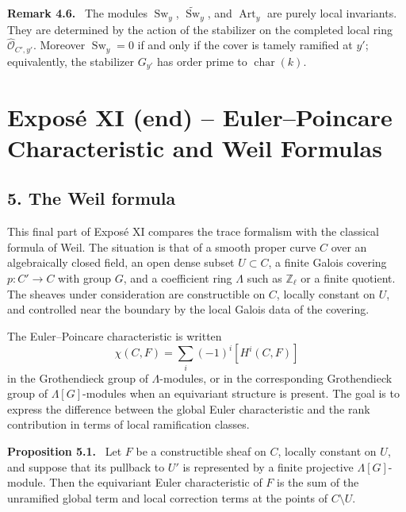 \documentclass[14pt]{extarticle}
\newcommand{\ZZ}{\mathbb Z}
\newcommand{\Sw}{\operatorname{Sw}}
\newcommand{\Art}{\operatorname{Art}}
\newcommand{\cO}{\mathcal O}
\newcommand{\wt}[1]{\widetilde{#1}}
\newcommand{\wh}[1]{\widehat{#1}}
\newenvironment{statement}[1]{\par\medskip\noindent\textbf{#1.}\ }{\par\medskip}
\begin{document}
\begin{statement}{Remark 4.6}
The modules $\Sw_y$, $\wt{\Sw}_y$, and $\Art_y$ are purely local invariants. They are determined by the action of the stabilizer on the completed local ring $\wh{\cO}_{C',y'}$. Moreover $\Sw_y=0$ if and only if the cover is tamely ramified at $y'$; equivalently, the stabilizer $G_{y'}$ has order prime to $\operatorname{char}(k)$.
\end{statement}


\newpage

\section*{Expos\'e XI (end) -- Euler--Poincare Characteristic and Weil Formulas}

\subsection*{5. The Weil formula}

This final part of Expos\'e XI compares the trace formalism with the classical formula of Weil. The situation is that of a smooth proper curve $C$ over an algebraically closed field, an open dense subset $U\subset C$, a finite Galois covering $p:C'\to C$ with group $G$, and a coefficient ring $\Lambda$ such as $\ZZ_\ell$ or a finite quotient. The sheaves under consideration are constructible on $C$, locally constant on $U$, and controlled near the boundary by the local Galois data of the covering.

The Euler--Poincare characteristic is written
\[
   \chi(C,F)=\sum_i(-1)^i[H^i(C,F)]
\]
in the Grothendieck group of $\Lambda$-modules, or in the corresponding Grothendieck group of $\Lambda[G]$-modules when an equivariant structure is present. The goal is to express the difference between the global Euler characteristic and the rank contribution in terms of local ramification classes.

\begin{statement}{Proposition 5.1}
Let $F$ be a constructible sheaf on $C$, locally constant on $U$, and suppose that its pullback to $U'$ is represented by a finite projective $\Lambda[G]$-module. Then the equivariant Euler characteristic of $F$ is the sum of the unramified global term and local correction terms at the points of $C\setminus U$.
\end{statement}
\end{document}
